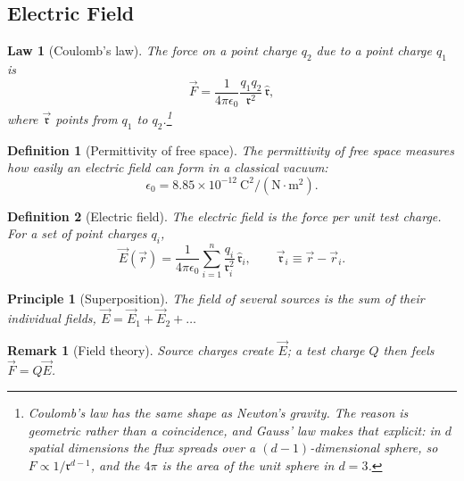 \documentclass{article}
\newtheorem{law}{Law}
\newtheorem{principle}{Principle}
\newtheorem{definition}{Definition}
\newtheorem{remark}{Remark}
\begin{document}
\subsection{Electric Field}
\begin{law}[Coulomb's law]
    The force on a point charge $q_2$ due to a point charge $q_1$ is
    \begin{equation}
        \vec{F} = \frac{1}{4\pi\epsilon_0}\frac{q_1q_2}{\mathfrak{r}^2}\,\hat{\mathfrak{r}},
    \end{equation}
    where $\vec{\mathfrak{r}}$ points from $q_1$ to $q_2$.\footnote{Coulomb's law has the same shape as Newton's gravity. The reason is geometric rather than a coincidence, and Gauss' law makes that explicit: in $d$ spatial dimensions the flux spreads over a $(d-1)$-dimensional sphere, so $F\propto 1/\mathfrak{r}^{d-1}$, and the $4\pi$ is the area of the unit sphere in $d=3$.}
\end{law}
\begin{definition}[Permittivity of free space]
    The permittivity of free space measures how easily an electric field can form in a classical vacuum:
    \[\epsilon_0 = 8.85 \times 10^{-12}\ \mathrm{C^2/(N\cdot m^2)}.\]
\end{definition}
\begin{definition}[Electric field]
    The electric field is the force per unit test charge. For a set of point charges $q_i$,
    \begin{equation}
        \vec{E}(\vec{r}) = \frac{1}{4\pi\epsilon_0}\sum_{i=1}^{n}\frac{q_i}{\mathfrak{r}_i^2}\,\hat{\mathfrak{r}}_i,
        \qquad \vec{\mathfrak{r}}_i \equiv \vec{r} - \vec{r}_i.
    \end{equation}
\end{definition}
\begin{principle}[Superposition]
    \label{Superposition}
    The field of several sources is the sum of their individual fields, $\vec{E} = \vec{E}_1 + \vec{E}_2 + \dots$
\end{principle}
\begin{remark}[Field theory]
    Source charges create $\vec{E}$; a test charge $Q$ then feels $\vec{F} = Q\vec{E}$.
\end{remark}
\end{document}
